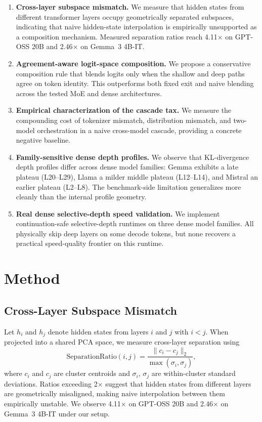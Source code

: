\documentclass[11pt]{article}
\begin{document}
\begin{enumerate}
\item \textbf{Cross-layer subspace mismatch.} We measure that hidden states from different transformer layers occupy geometrically separated subspaces, indicating that naive hidden-state interpolation is empirically unsupported as a composition mechanism. Measured separation ratios reach 4.11$\times$ on GPT-OSS 20B and 2.46$\times$ on Gemma~3 4B-IT.

\item \textbf{Agreement-aware logit-space composition.} We propose a conservative composition rule that blends logits only when the shallow and deep paths agree on token identity. This outperforms both fixed exit and naive blending across the tested MoE and dense architectures.

\item \textbf{Empirical characterization of the cascade tax.} We measure the compounding cost of tokenizer mismatch, distribution mismatch, and two-model orchestration in a naive cross-model cascade, providing a concrete negative baseline.

\item \textbf{Family-sensitive dense depth profiles.} We observe that KL-divergence depth profiles differ across dense model families: Gemma exhibits a late plateau (L20--L29), Llama a milder middle plateau (L12--L14), and Mistral an earlier plateau (L2--L8). The benchmark-side limitation generalizes more cleanly than the internal profile geometry.

\item \textbf{Real dense selective-depth speed validation.} We implement continuation-safe selective-depth runtimes on three dense model families. All physically skip deep layers on some decode tokens, but none recovers a practical speed-quality frontier on this runtime.
\end{enumerate}

\section{Method}

\subsection{Cross-Layer Subspace Mismatch}

Let $h_i$ and $h_j$ denote hidden states from layers $i$ and $j$ with $i < j$. When projected into a shared PCA space, we measure cross-layer separation using
\begin{equation}
\mathrm{SeparationRatio}(i,j) =
\frac{\lVert c_i - c_j \rVert_2}{\max(\sigma_i,\sigma_j)},
\label{eq:separation}
\end{equation}
where $c_i$ and $c_j$ are cluster centroids and $\sigma_i$, $\sigma_j$ are within-cluster standard deviations. Ratios exceeding 2$\times$ suggest that hidden states from different layers are geometrically misaligned, making naive interpolation between them empirically unstable. We observe 4.11$\times$ on GPT-OSS 20B and 2.46$\times$ on Gemma~3 4B-IT under our setup.
\end{document}
